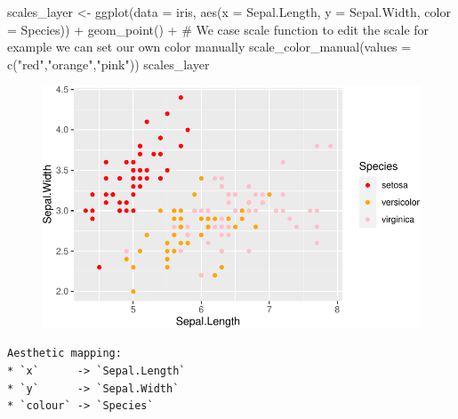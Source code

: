 \documentclass[
  letterpaper,
]{book}
\newenvironment{Shaded}{\begin{snugshade}}{\end{snugshade}}
\newcommand{\AttributeTok}[1]{\textcolor[rgb]{0.40,0.45,0.13}{#1}}
\newcommand{\CommentTok}[1]{\textcolor[rgb]{0.37,0.37,0.37}{#1}}
\newcommand{\FunctionTok}[1]{\textcolor[rgb]{0.28,0.35,0.67}{#1}}
\newcommand{\NormalTok}[1]{\textcolor[rgb]{0.00,0.23,0.31}{#1}}
\newcommand{\OtherTok}[1]{\textcolor[rgb]{0.00,0.23,0.31}{#1}}
\newcommand{\SpecialCharTok}[1]{\textcolor[rgb]{0.37,0.37,0.37}{#1}}
\newcommand{\StringTok}[1]{\textcolor[rgb]{0.13,0.47,0.30}{#1}}
\begin{document}
\begin{Shaded}
\begin{Highlighting}[]
\NormalTok{scales\_layer }\OtherTok{\textless{}{-}} \FunctionTok{ggplot}\NormalTok{(}\AttributeTok{data =}\NormalTok{ iris, }\FunctionTok{aes}\NormalTok{(}\AttributeTok{x =}\NormalTok{ Sepal.Length, }\AttributeTok{y =}\NormalTok{ Sepal.Width, }\AttributeTok{color =}\NormalTok{ Species)) }\SpecialCharTok{+}
  \FunctionTok{geom\_point}\NormalTok{() }\SpecialCharTok{+}
  \CommentTok{\# We case scale function to edit the scale for example we can set our own color manually}
  \FunctionTok{scale\_color\_manual}\NormalTok{(}\AttributeTok{values =} \FunctionTok{c}\NormalTok{(}\StringTok{"red"}\NormalTok{,}\StringTok{"orange"}\NormalTok{,}\StringTok{"pink"}\NormalTok{))}
\NormalTok{scales\_layer}
\end{Highlighting}
\end{Shaded}

\begin{figure}[H]

{\centering \includegraphics{./data_viz_files/figure-pdf/unnamed-chunk-9-1.pdf}

}

\end{figure}

\begin{Shaded}
\end{Shaded}

\begin{verbatim}
Aesthetic mapping: 
* `x`      -> `Sepal.Length`
* `y`      -> `Sepal.Width`
* `colour` -> `Species`
\end{verbatim}
\end{document}
